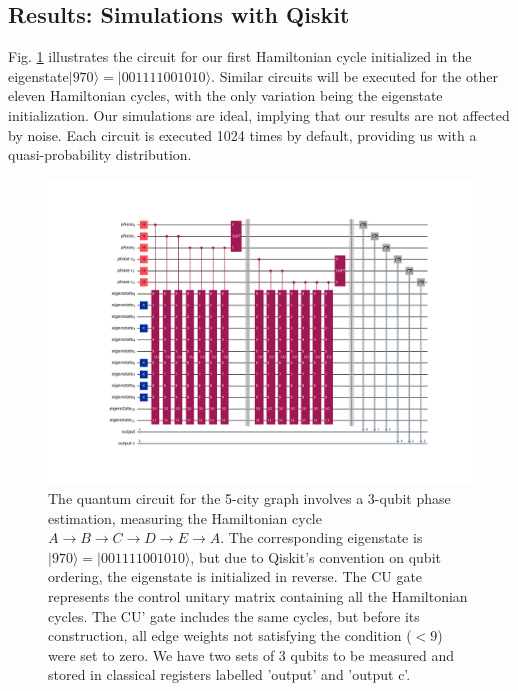 \documentclass[msc,oneside]{ubcthesis}
\begin{document}
		\subsection{Results: Simulations with Qiskit}  \label{5-city-sim}
	
	Fig. \ref{fig:5-city-circuit} illustrates the circuit for our first Hamiltonian cycle initialized in the eigenstate$|970\rangle  = |001111001010\rangle$. Similar circuits will be executed for the other eleven Hamiltonian cycles, with the only variation being the eigenstate initialization. Our simulations are ideal, implying that our results are not affected by noise. Each circuit is executed 1024 times by default, providing us with a quasi-probability distribution.
	
	\begin{figure}[!h]
		\centering
		\includegraphics[trim={8.5cm 4.4cm 6cm 4.4cm},clip, width=1 \linewidth]{"graphics/5-city-1-cycle-constrained-barrier"}
		\caption{ The quantum circuit for the 5-city graph involves a 3-qubit phase estimation, measuring the Hamiltonian cycle $A \rightarrow B \rightarrow C \rightarrow D \rightarrow E \rightarrow A$. The corresponding eigenstate is $|970\rangle  = |001111001010\rangle$, but due to Qiskit's convention on qubit ordering, the eigenstate is initialized in reverse. The CU gate represents the control unitary matrix containing all the Hamiltonian cycles. The CU' gate includes the same cycles, but before its construction, all edge weights not satisfying the condition ($< 9$) were set to zero. We have two sets of 3 qubits to be measured and stored in classical registers labelled 'output' and 'output c'.
		}
		\label{fig:5-city-circuit}
	\end{figure}
	
\end{document}
